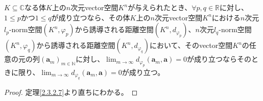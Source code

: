 \documentclass[dvipdfmx]{jsarticle}
\begin{document}
\begin{thm}\label{2.3.2.8}
$K \subseteq \mathbb{C}$なる体$K$上の$n$次元vector空間$K^{n}$が与えられたとき、$\forall p,q \in \mathbb{R}$に対し、$1 \leq p$かつ$1 \leq q$が成り立つなら、その体$K$上の$n$次元vector空間$K^{n}$における$n$次元$l_{p}$-norm空間$\left( K^{n},\varphi_{p} \right)$から誘導される距離空間$\left( K^{n},d_{\varphi_{p}} \right)$、$n$次元$l_{q}$-norm空間$\left( K^{n},\varphi_{q} \right)$から誘導される距離空間$\left( K^{n},d_{\varphi_{q}} \right)$において、そのvector空間$K^{n}$の任意の元の列$\left( \mathbf{a}_{m} \right)_{m \in \mathbb{N}}$に対し、$\lim_{m \rightarrow \infty}{d_{\varphi_{p}}\left( \mathbf{a}_{m},\mathbf{a} \right)} = 0$が成り立つならそのときに限り、$\lim_{m \rightarrow \infty}{d_{\varphi_{q}}\left( \mathbf{a}_{m},\mathbf{a} \right)} = 0$が成り立つ。
\end{thm}
\begin{proof}
定理\ref{2.3.2.7}より直ちにわかる。
\end{proof}
\end{document}
